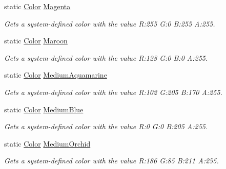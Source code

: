 \begin{DoxyCompactItemize}
static \hyperlink{struct_microsoft_1_1_xna_1_1_framework_1_1_color}{Color} \hyperlink{struct_microsoft_1_1_xna_1_1_framework_1_1_color_ad73e67f7969432c254155ea8ef40c843}{Magenta}
\begin{DoxyCompactList}\small\item\em Gets a system-\/defined color with the value R\+:255 G\+:0 B\+:255 A\+:255.\end{DoxyCompactList}\item 
static \hyperlink{struct_microsoft_1_1_xna_1_1_framework_1_1_color}{Color} \hyperlink{struct_microsoft_1_1_xna_1_1_framework_1_1_color_a11631c2203817f8a406a3bdc33a3d659}{Maroon}
\begin{DoxyCompactList}\small\item\em Gets a system-\/defined color with the value R\+:128 G\+:0 B\+:0 A\+:255.\end{DoxyCompactList}\item 
static \hyperlink{struct_microsoft_1_1_xna_1_1_framework_1_1_color}{Color} \hyperlink{struct_microsoft_1_1_xna_1_1_framework_1_1_color_a1574c0abfeaca00c17d272915af2e362}{Medium\+Aquamarine}
\begin{DoxyCompactList}\small\item\em Gets a system-\/defined color with the value R\+:102 G\+:205 B\+:170 A\+:255.\end{DoxyCompactList}\item 
static \hyperlink{struct_microsoft_1_1_xna_1_1_framework_1_1_color}{Color} \hyperlink{struct_microsoft_1_1_xna_1_1_framework_1_1_color_a5774742dabf76dd7cf95ff1fae8f96d6}{Medium\+Blue}
\begin{DoxyCompactList}\small\item\em Gets a system-\/defined color with the value R\+:0 G\+:0 B\+:205 A\+:255.\end{DoxyCompactList}\item 
static \hyperlink{struct_microsoft_1_1_xna_1_1_framework_1_1_color}{Color} \hyperlink{struct_microsoft_1_1_xna_1_1_framework_1_1_color_a0d84283d024d1ec0359f55d9879bc10f}{Medium\+Orchid}
\begin{DoxyCompactList}\small\item\em Gets a system-\/defined color with the value R\+:186 G\+:85 B\+:211 A\+:255.\end{DoxyCompactList}\item 

\end{DoxyCompactItemize}
